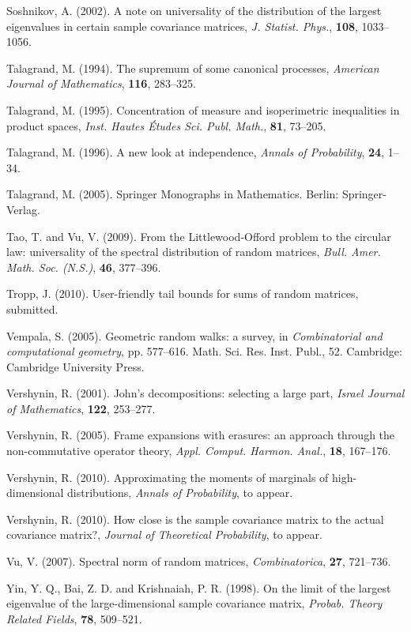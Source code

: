 \documentclass[10pt, openany]{book}
\theoremstyle{remark}
\begin{document}
\begin{thebibliography}{}
 Soshnikov, A. (2002). 
  \newblock A note on universality of the distribution of the largest eigenvalues in 
    certain sample covariance matrices, 
  {\em J. Statist. Phys.}, {\bf 108}, 1033--1056.

 Talagrand, M. (1994).
  \newblock The supremum of some canonical processes, 
  {\em American Journal of Mathematics}, {\bf 116}, 283--325.
  
 Talagrand, M. (1995).
  \newblock Concentration of measure and isoperimetric inequalities in product spaces,
  {\em Inst. Hautes \'Etudes Sci. Publ. Math.}, {\bf 81}, 73--205.

 Talagrand, M. (1996).
  \newblock A new look at independence,  
  {\em Annals of Probability}, {\bf 24}, 1--34.

 Talagrand, M. (2005).
  Springer Monographs in Mathematics. 
  Berlin: Springer-Verlag.
  
 Tao, T. and Vu, V. (2009).
  \newblock From the Littlewood-Offord problem to the circular law: 
    universality of the spectral distribution of random matrices,
  {\em Bull. Amer. Math. Soc. (N.S.)}, {\bf 46}, 377--396.

 Tropp, J. (2010).
  \newblock User-friendly tail bounds for sums of random matrices,
  submitted.

 Vempala, S. (2005).
  \newblock Geometric random walks: a survey, 
  in {\em Combinatorial and computational geometry},  pp. 577--616. 
  Math. Sci. Res. Inst. Publ., 52.
  Cambridge: Cambridge University Press.

 Vershynin, R. (2001).
  \newblock John's decompositions: selecting a large part,
  {\em Israel Journal of Mathematics}, {\bf 122}, 253--277.

 Vershynin, R. (2005).
  \newblock Frame expansions with erasures: an approach through the non-commutative operator theory,  
  {\em Appl. Comput. Harmon. Anal.}, {\bf 18}, 167--176.
  
 Vershynin, R. (2010).
  \newblock Approximating the moments of marginals of high-dimensional distributions, 
  {\em Annals of Probability}, to appear.


 Vershynin, R. (2010).
  \newblock How close is the sample covariance matrix to the actual covariance matrix?,
  {\em Journal of Theoretical Probability}, to appear. 
  
 Vu, V. (2007).
  \newblock Spectral norm of random matrices,
  {\em Combinatorica}, {\bf 27}, 721--736.
  
 Yin, Y. Q., Bai, Z. D. and Krishnaiah, P. R. (1998).
  \newblock On the limit of the largest eigenvalue of the large-dimensional sample covariance matrix,
  {\em Probab. Theory Related Fields}, {\bf 78}, 509--521.

\end{thebibliography}

\printindex
\end{document}
